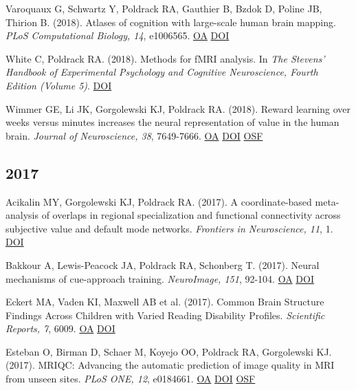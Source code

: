 \documentclass[10pt, letterpaper]{article}
\begin{document}
Varoquaux G, Schwartz Y, Poldrack RA, Gauthier B, Bzdok D, Poline JB, Thirion B.  (2018). Atlases of cognition with large-scale human brain mapping. \textit{PLoS Computational Biology, 14}, e1006565. \href{https://www.ncbi.nlm.nih.gov/pmc/articles/PMC6289578}{OA} \href{https://doi.org/10.1371/journal.pcbi.1006565}{DOI} \vspace{2mm}

White C, Poldrack RA.  (2018). Methods for fMRI analysis. In \textit{The Stevens’ Handbook of Experimental Psychology and Cognitive Neuroscience, Fourth Edition (Volume 5)}. \href{https://doi.org/10.1002/9781119170174.epcn515}{DOI} \vspace{2mm}

Wimmer GE, Li JK, Gorgolewski KJ, Poldrack RA.  (2018). Reward learning over weeks versus minutes increases the neural representation of value in the human brain. \textit{Journal of Neuroscience, 38}, 7649-7666. \href{https://www.ncbi.nlm.nih.gov/pmc/articles/PMC6113901}{OA} \href{https://doi.org/10.1523/jneurosci.0075-18.2018}{DOI} \href{https://osf.io/z2gwf/}{OSF} \vspace{2mm}

\subsection*{2017}Acikalin MY, Gorgolewski KJ, Poldrack RA.  (2017). A coordinate-based meta-analysis of overlaps in regional specialization and functional connectivity across subjective value and default mode networks. \textit{Frontiers in Neuroscience, 11}, 1. \href{https://doi.org/10.3389/fnins.2017.00001}{DOI} \vspace{2mm}

Bakkour A, Lewis-Peacock JA, Poldrack RA, Schonberg T.  (2017). Neural mechanisms of cue-approach training. \textit{NeuroImage, 151}, 92-104. \href{https://www.ncbi.nlm.nih.gov/pmc/articles/PMC5365383}{OA} \href{https://doi.org/10.1016/j.neuroimage.2016.09.059}{DOI} \vspace{2mm}

Eckert MA, Vaden KI, Maxwell AB et al. (2017). Common Brain Structure Findings Across Children with Varied Reading Disability Profiles. \textit{Scientific Reports, 7}, 6009. \href{https://www.ncbi.nlm.nih.gov/pmc/articles/PMC5519686}{OA} \href{https://doi.org/10.1038/s41598-017-05691-5}{DOI} \vspace{2mm}

Esteban O, Birman D, Schaer M, Koyejo OO, Poldrack RA, Gorgolewski KJ.  (2017). MRIQC: Advancing the automatic prediction of image quality in MRI from unseen sites. \textit{PLoS ONE, 12}, e0184661. \href{https://www.ncbi.nlm.nih.gov/pmc/articles/PMC5612458}{OA} \href{https://doi.org/10.1371/journal.pone.0184661}{DOI} \href{https://osf.io/haf97/}{OSF} \vspace{2mm}
\end{document}
